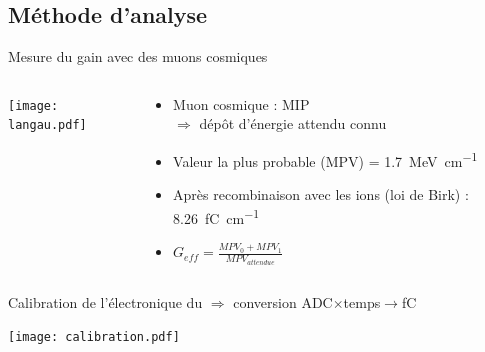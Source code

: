     \subsection{Méthode d'analyse}

    \begin{frame}{Mesure du gain avec des muons cosmiques}
    	\begin{scriptsize}
            \begin{columns}
                \begin{column}{0.6\textwidth}
                    \centering \texttt{[image: langau.pdf]}
                \end{column}\hfill
                \begin{column}{0.4\textwidth}
                    \begin{itemize}
       					\item Muon cosmique : MIP \\ $\Rightarrow$ dépôt d'énergie attendu connu
       					\item Valeur la plus probable (MPV) = \SI{1.7}{\mega\electronvolt\per\centi\meter}
       					\item Après recombinaison avec les ions (loi de Birk) : \SI{8.26}{\femto\coulomb\per\centi\meter}
       					\item $G_{eff}=\frac{MPV_0 + MPV_1}{MPV_{attendue}}$
       				\end{itemize}
                \end{column}
            \end{columns}
            \vspace{0.2cm}
            Calibration de l'électronique du \TOO{} $\Rightarrow$ conversion ADC$\times$temps$\to$\si{\femto\coulomb}
            \begin{center} \texttt{[image: calibration.pdf]} \end{center}
	    \end{scriptsize}
    \end{frame}

